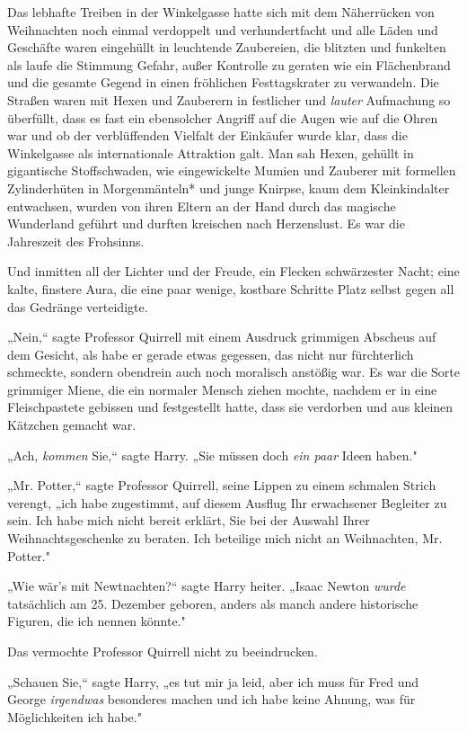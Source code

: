 {\hfill\break Das lebhafte Treiben in der Winkelgasse hatte sich mit dem Näherrücken von Weihnachten noch einmal verdoppelt und verhundertfacht und alle Läden und Geschäfte waren eingehüllt in leuchtende Zaubereien, die blitzten und funkelten als laufe die Stimmung Gefahr, außer Kontrolle zu geraten wie ein Flächenbrand und die gesamte Gegend in einen fröhlichen Festtagskrater zu verwandeln. Die Straßen waren mit Hexen und Zauberern in festlicher und \emph{lauter} Aufmachung so überfüllt, dass es fast ein ebensolcher Angriff auf die Augen wie auf die Ohren war und ob der verblüffenden Vielfalt der Einkäufer wurde klar, dass die Winkelgasse als internationale Attraktion galt. Man sah Hexen, gehüllt in gigantische Stoffschwaden, wie eingewickelte Mumien und Zauberer mit formellen Zylinderhüten in Morgenmänteln* und junge Knirpse, kaum dem Kleinkindalter entwachsen, wurden von ihren Eltern an der Hand durch das magische Wunderland geführt und durften kreischen nach Herzenslust. Es war die Jahreszeit des Frohsinns.

Und inmitten all der Lichter und der Freude, ein Flecken schwärzester Nacht; eine kalte, finstere Aura, die eine paar wenige, kostbare Schritte Platz selbst gegen all das Gedränge verteidigte.

„Nein,“ sagte Professor Quirrell mit einem Ausdruck grimmigen Abscheus auf dem Gesicht, als habe er gerade etwas gegessen, das nicht nur fürchterlich schmeckte, sondern obendrein auch noch moralisch anstößig war. Es war die Sorte grimmiger Miene, die ein normaler Mensch ziehen mochte, nachdem er in eine Fleischpastete gebissen und festgestellt hatte, dass sie verdorben und aus kleinen Kätzchen gemacht war.

„Ach, \emph{kommen} Sie,“ sagte Harry. „Sie müssen doch \emph{ein paar} Ideen haben."

„Mr. Potter,“ sagte Professor Quirrell, seine Lippen zu einem schmalen Strich verengt, „ich habe zugestimmt, auf diesem Ausflug Ihr erwachsener Begleiter zu sein. Ich habe mich nicht bereit erklärt, Sie bei der Auswahl Ihrer Weihnachtsgeschenke zu beraten. Ich beteilige mich nicht an Weihnachten, Mr. Potter."

„Wie wär's mit Newtnachten?“ sagte Harry heiter. „Isaac Newton \emph{wurde} tatsächlich am 25. Dezember geboren, anders als manch andere historische Figuren, die ich nennen könnte."

Das vermochte Professor Quirrell nicht zu beeindrucken.

„Schauen Sie,“ sagte Harry, „es tut mir ja leid, aber ich muss für Fred und George \emph{irgendwas} besonderes machen und ich habe keine Ahnung, was für Möglichkeiten ich habe."

}
